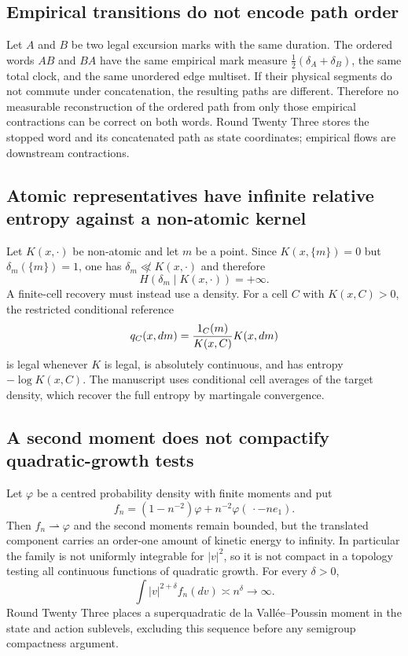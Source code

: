 \subsection{Empirical transitions do not encode path order}

Let $A$ and $B$ be two legal excursion marks with the same duration.  The
ordered words $AB$ and $BA$ have the same empirical mark measure
$\frac12(\delta_A+\delta_B)$, the same total clock, and the same unordered edge
multiset.  If their physical segments do not commute under concatenation, the
resulting paths are different.  Therefore no measurable reconstruction of the
ordered path from only those empirical contractions can be correct on both
words.  Round Twenty Three stores the stopped word and its concatenated path
as state coordinates; empirical flows are downstream contractions.

\subsection{Atomic representatives have infinite relative entropy against a non-atomic kernel}

Let $K(x,\cdot)$ be non-atomic and let $m$ be a point.  Since
$K(x,\{m\})=0$ but $\delta_m(\{m\})=1$, one has
$\delta_m\not\ll K(x,\cdot)$ and therefore
\[
 H(\delta_m\mid K(x,\cdot))=+\infty.
\]
A finite-cell recovery must instead use a density.  For a cell $C$ with
$K(x,C)>0$, the restricted conditional reference
\[
 q_C(x,dm)={1_C(m)\over K(x,C)}K(x,dm)
\]
is legal whenever $K$ is legal, is absolutely continuous, and has entropy
$-\log K(x,C)$.  The manuscript uses conditional cell averages of the target
density, which recover the full entropy by martingale convergence.

\subsection{A second moment does not compactify quadratic-growth tests}

Let $\varphi$ be a centred probability density with finite moments and put
\[
 f_n=(1-n^{-2})\varphi+n^{-2}\varphi(\,\cdot-ne_1).
\]
Then $f_n\rightharpoonup\varphi$ and the second moments remain bounded, but the
translated component carries an order-one amount of kinetic energy to
infinity.  In particular the family is not uniformly integrable for
$|v|^2$, so it is not compact in a topology testing all continuous functions
of quadratic growth.  For every $\delta>0$,
\[
 \int |v|^{2+\delta}f_n(dv)\asymp n^\delta\longrightarrow\infty.
\]
Round Twenty Three places a superquadratic de la Vall\'ee--Poussin moment in
the state and action sublevels, excluding this sequence before any semigroup
compactness argument.

